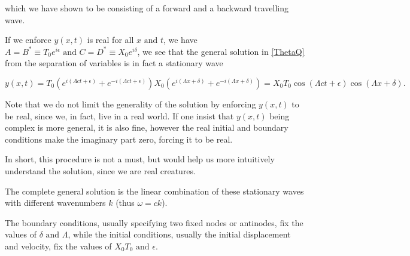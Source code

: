 \documentclass[a4paper,12pt]{report}
\begin{document}
which we have shown to be consisting of a forward and a backward travelling wave.

If we enforce \(y(x,t)\) is real for all \(x \text { and } t\), we have \(A=B^* \equiv T_0 e^{i\epsilon } \text { and } C=D^* \equiv X_0 e^{i\delta } \), we see that the general solution in \cref{ThetaQ} from the separation of variables is in fact a stationary wave

\begin{equation}
	y(x,t) = T_0 (e^{i (\Lambda ct + \epsilon )}+e^{-i(\Lambda ct+\epsilon )}  ) X_0 (e^{i(\Lambda x+\delta )}+e^{-i(\Lambda x+\delta )} ) = X_0 T_0 \cos (\Lambda ct + \epsilon ) \cos (\Lambda x+\delta ).
\end{equation}

Note that we do not limit the generality of the solution by enforcing \(y(x,t)\) to be real, since we, in fact, live in a real world. If one insist that \(y(x,t)\) being complex is more general, it is also fine, however the real initial and boundary conditions make the imaginary part zero, forcing it to be real. 

In short, this procedure is not a must, but would help us more intuitively understand the solution, since we are real creatures.

The complete general solution is the linear combination of these stationary waves with different wavenumbers \(k\) (thus \(\omega = ck\)).

The boundary conditions, usually specifying two fixed nodes or antinodes, fix the values of \(\delta \text { and } \Lambda \), while the initial conditions, usually the initial displacement and velocity, fix the values of \(X_0 T_0 \text { and } \epsilon \).
\end{document}
